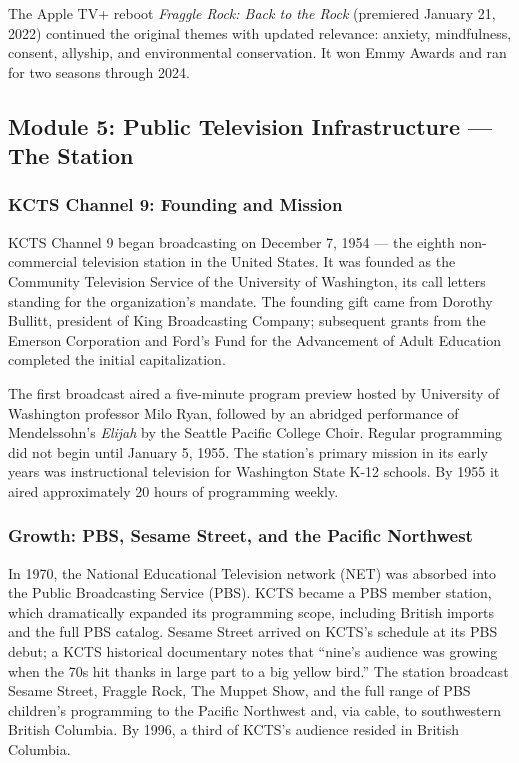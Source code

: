 \documentclass[11pt,letterpaper]{article}
\begin{document}
The Apple TV+ reboot \textit{Fraggle Rock: Back to the Rock} (premiered January 21, 2022) continued the original themes with updated relevance: anxiety, mindfulness, consent, allyship, and environmental conservation. It won Emmy Awards and ran for two seasons through 2024.

\subsection{Module 5: Public Television Infrastructure --- The Station}

\subsubsection{KCTS Channel 9: Founding and Mission}

KCTS Channel 9 began broadcasting on December 7, 1954 --- the eighth non-commercial television station in the United States. It was founded as the Community Television Service of the University of Washington, its call letters standing for the organization's mandate. The founding gift came from Dorothy Bullitt, president of King Broadcasting Company; subsequent grants from the Emerson Corporation and Ford's Fund for the Advancement of Adult Education completed the initial capitalization.

The first broadcast aired a five-minute program preview hosted by University of Washington professor Milo Ryan, followed by an abridged performance of Mendelssohn's \textit{Elijah} by the Seattle Pacific College Choir. Regular programming did not begin until January 5, 1955. The station's primary mission in its early years was instructional television for Washington State K-12 schools. By 1955 it aired approximately 20 hours of programming weekly.

\subsubsection{Growth: PBS, Sesame Street, and the Pacific Northwest}

In 1970, the National Educational Television network (NET) was absorbed into the Public Broadcasting Service (PBS). KCTS became a PBS member station, which dramatically expanded its programming scope, including British imports and the full PBS catalog. Sesame Street arrived on KCTS's schedule at its PBS debut; a KCTS historical documentary notes that ``nine's audience was growing when the 70s hit thanks in large part to a big yellow bird.'' The station broadcast Sesame Street, Fraggle Rock, The Muppet Show, and the full range of PBS children's programming to the Pacific Northwest and, via cable, to southwestern British Columbia. By 1996, a third of KCTS's audience resided in British Columbia.
\end{document}
